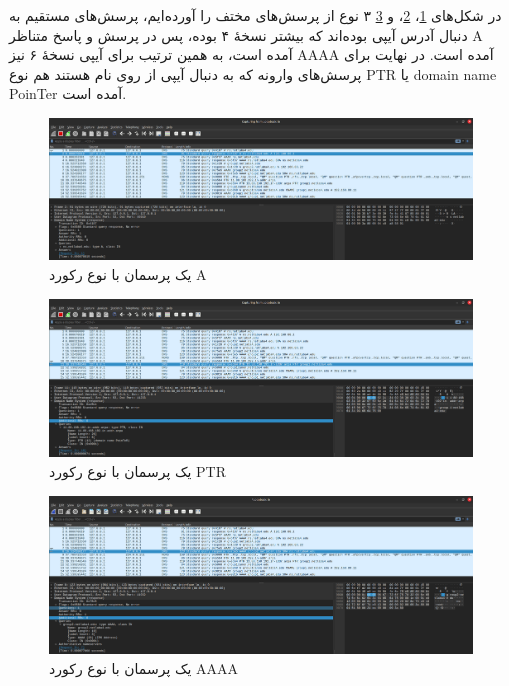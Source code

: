 \documentclass[12pt]{article}
\begin{document}
	\subsubsection{}
	در شکل‌های \ref{dns:9}، \ref{dns:10}، و \ref{dns:11} ۳ نوع از پرسش‌های مختف را آورده‌ایم، پرسش‌های مستقیم به دنبال آدرس آیپی بوده‌اند که بیشتر نسخهٔ ۴ بوده، پس در پرسش و پاسخ متناظر A آمده است، به همین ترتیب برای آیپی نسخهٔ ۶ نیز AAAA آمده است. در نهایت برای پرسش‌های وارونه که به دنبال آیپی از روی نام هستند هم نوع PTR یا \textenglish{domain name PoinTer} آمده است.
	\begin{figure}[H]
		\centering
		\includegraphics[width=\textwidth]{resources/11.png}
		\caption{یک پرسمان با نوع رکورد A}
		\label{dns:9}
	\end{figure}
	\begin{figure}[H]
		\centering
		\includegraphics[width=\textwidth]{resources/12.png}
		\caption{یک پرسمان با نوع رکورد PTR}
		\label{dns:10}
	\end{figure}
	\begin{figure}[H]
		\centering
		\includegraphics[width=\textwidth]{resources/13.png}
		\caption{یک پرسمان با نوع رکورد AAAA}
		\label{dns:11}
	\end{figure}
	
	\newpage
	\begin{LTR}
		\printbibliography[title={مراجع}]
	\end{LTR}
	
\end{document}

